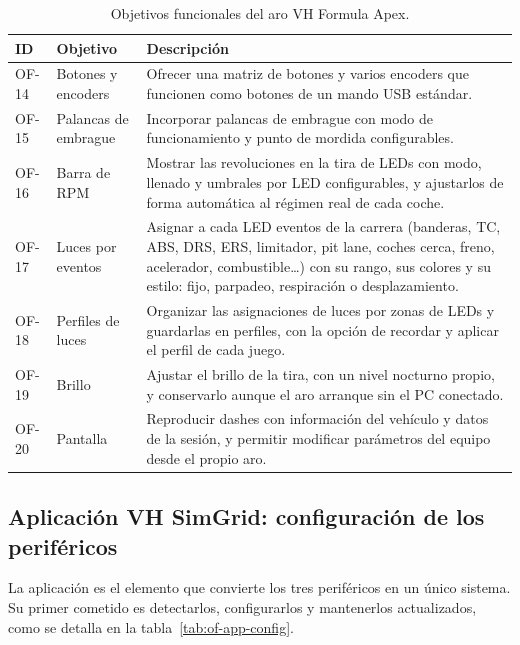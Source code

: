 \begin{table}[htbp]
	\centering
	\caption{Objetivos funcionales del aro VH Formula Apex.}
	\label{tab:of-aro}
	\small
	\begin{tabularx}{\textwidth}{@{}l>{\raggedright\arraybackslash}p{3.6cm}X@{}}
		\toprule
		\textbf{ID} & \textbf{Objetivo} & \textbf{Descripción} \\
		\midrule
		OF-14 & Botones y encoders &
		Ofrecer una matriz de botones y varios encoders que funcionen como botones de un mando USB estándar. \\
		OF-15 & Palancas de embrague &
		Incorporar palancas de embrague con modo de funcionamiento y punto de mordida configurables. \\
		OF-16 & Barra de RPM &
		Mostrar las revoluciones en la tira de LEDs con modo, llenado y umbrales por LED configurables, y ajustarlos de forma automática al régimen real de cada coche. \\
		OF-17 & Luces por eventos &
		Asignar a cada LED eventos de la carrera (banderas, TC, ABS, DRS, ERS, limitador, pit lane, coches cerca, freno, acelerador, combustible\ldots) con su rango, sus colores y su estilo: fijo, parpadeo, respiración o desplazamiento. \\
		OF-18 & Perfiles de luces &
		Organizar las asignaciones de luces por zonas de LEDs y guardarlas en perfiles, con la opción de recordar y aplicar el perfil de cada juego. \\
		OF-19 & Brillo &
		Ajustar el brillo de la tira, con un nivel nocturno propio, y conservarlo aunque el aro arranque sin el PC conectado. \\
		OF-20 & Pantalla &
		Reproducir dashes con información del vehículo y datos de la sesión, y permitir modificar parámetros del equipo desde el propio aro. \\
		\bottomrule
	\end{tabularx}
\end{table}

\subsection{Aplicación VH SimGrid: configuración de los periféricos}
\label{subsec:of-app-config}

La aplicación es el elemento que convierte los tres periféricos en un único sistema. Su primer cometido es detectarlos, configurarlos y mantenerlos actualizados, como se detalla en la tabla~\ref{tab:of-app-config}.

